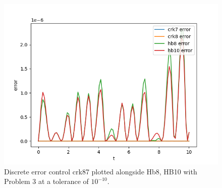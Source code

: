 \begin{figure}[H]
\centering
\includegraphics[width=0.7\linewidth]{./figures/discrete_crk87_vs_hbs_p3_10}
\caption{Discrete error control crk87 plotted alongside Hb8, HB10 with Problem 3 at a tolerance of $10^{-10}$.}
\label{fig:discrete_crk87_vs_hbs_p3_10}
\end{figure}